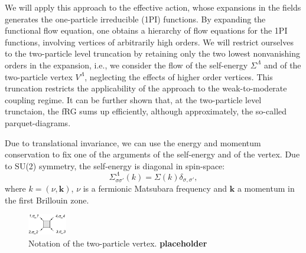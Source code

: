 We will apply this approach to the effective action, whose expansions in the fields generates the one-particle irreducible (1PI)  functions. By expanding the functional flow equation, one obtains a hierarchy of flow equations for the 1PI functions, involving vertices of arbitrarily  high orders. 
We will restrict ourselves to the two-particle level truncation by retaining only the two lowest nonvanishing orders in the expansion, i.e., we consider the flow of the self-energy $\Sigma^\Lambda$ and of the two-particle vertex $V^\Lambda$, neglecting the effects of higher order vertices. 
This truncation restricts the applicability of the approach to the weak-to-moderate coupling regime\cite{Salmhofer2001}. 
It can be further shown that, at the two-particle level trunctaion, the fRG sums up efficiently, although approximately, the so-called parquet-diagrams\cite{Binz2002,Binz2003,Kugler2017}. 

Due to translational invariance, we can use the energy and momentum conservation to fix one of the arguments of the self-energy and of the vertex.  
Due to SU(2) symmetry, the self-energy is diagonal in spin-space: 
\begin{equation}
\Sigma^\Lambda_{\sigma\sigma'}(k)=\Sigma(k)\delta_{\sigma,\sigma'}, 
\end{equation}
where $k=(\nu,\mathbf{k})$, $\nu$ is a fermionic Matsubara frequency and $\mathbf{k}$ a momentum in the first Brillouin zone. 
\begin{figure}
\includegraphics[width=0.15\textwidth]{images/VertexBox.png}
\caption{Notation of the two-particle vertex. \textbf{placeholder}
} 
\label{fig:notvert} 
\end{figure}

